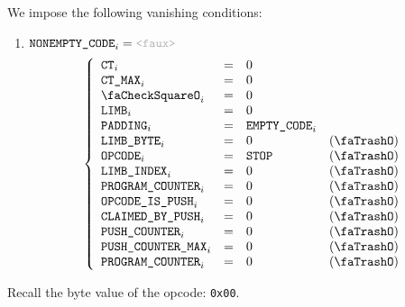 We impose the following vanishing conditions:
\begin{enumerate}
    \item
	\If $\romColumnNonemptyCode _{i} = \false$ \Then 
	\[
	    \left\{ \begin{array}{lclr}
		\ct                      _{i} & = & 0                        \\
		\ctMax                   _{i} & = & 0                        \\
		\done                    _{i} & = & 0                        \\
		\romColumnLimb           _{i} & = & 0                        \\
		\romColumnPadding        _{i} & = & \romColumnEmptyCode _{i} \\
		\romColumnLimbByte       _{i} & = & 0                         & (\trash) \\
		\romColumnOpcode         _{i} & = & \inst{STOP}               & (\trash) \\
		\romColumnLimbIndex      _{i} & = & 0                         & (\trash) \\
		\romColumnProgramCounter _{i} & = & 0                         & (\trash) \\
		\romColumnOpcodeIsPush   _{i} & = & 0                         & (\trash) \\
		\romColumnClaimedByPush  _{i} & = & 0                         & (\trash) \\
		\CP                      _{i} & = & 0                         & (\trash) \\
		\PP                      _{i} & = & 0                         & (\trash) \\
		\romColumnProgramCounter _{i} & = & 0                         & (\trash) \\
	    \end{array} \right.
	\]
\end{enumerate}
\saNote{}
Recall the byte value of the  opcode: \texttt{0x00}.
